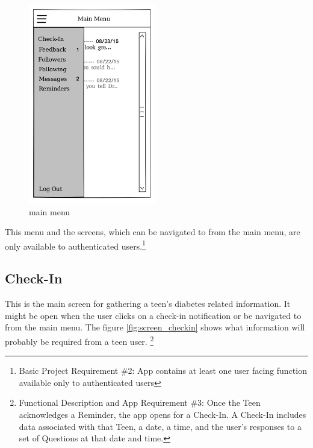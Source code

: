 \documentclass{article}
\begin{document}
    \begin{figure}[h]
        \centering
        \includegraphics[width=0.5\textwidth,height=\textheight,keepaspectratio]{main.png}
        \caption{main menu}
        \label{fig:screen_main}
    \end{figure}


    This menu and the screens, which can be navigated to from the main menu, are only available to authenticated users.\footnote{Basic Project Requirement \#2: App contains at least one user facing function available only to authenticated users}

\newpage

    \subsection{Check-In}

    This is the main screen for gathering a teen's diabetes related information. It might be open when the user clicks on a check-in notification or be navigated to from the main menu. The figure \ref{fig:screen_checkin} shows what information will probably be required from a teen user.
    \footnote{Functional Description and App Requirement \#3: Once the Teen acknowledges a Reminder, the app opens for a Check-In.  A Check-In includes data associated with that Teen, a date, a time, and the user's responses to a set of Questions at that date and time.}
\end{document}
